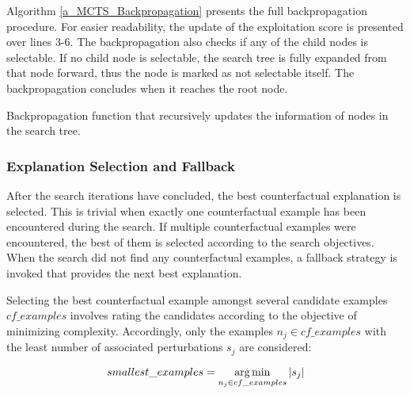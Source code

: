 Algorithm \ref{a_MCTS_Backpropagation} presents the full backpropagation procedure. For easier readability, the update of the exploitation score is presented over lines 3-6. The backpropagation also checks if any of the child nodes is selectable. If no child node is selectable, the search tree is fully expanded from that node forward, thus the node is marked as not selectable itself. The backpropagation concludes when it reaches the root node.

{
\setlength{\algomargin}{1.25em}
\small
\begin{algorithm}[ht]
\caption{Backpropagation function that recursively updates the information of nodes in the search tree.}
\label{a_MCTS_Backpropagation}
\end{algorithm}
}

\subsubsection{Explanation Selection and Fallback}
\label{s_Methodology_Search_Fallback}
After the search iterations have concluded, the best counterfactual explanation is selected. This is trivial when exactly one counterfactual example has been encountered during the search. If multiple counterfactual examples were encountered, the best of them is selected according to the search objectives. When the search did not find any counterfactual examples, a fallback strategy is invoked that provides the next best explanation.

Selecting the best counterfactual example amongst several candidate examples \(cf\_examples\) involves rating the candidates according to the objective of minimizing complexity. Accordingly, only the examples $n_j \in cf\_examples$ with the least number of associated perturbations $s_j$ are considered:

\begin{equation}
    smallest\_examples = \operatorname*{arg\,min}_{n_j \in cf\_examples} |s_j|
\end{equation}

